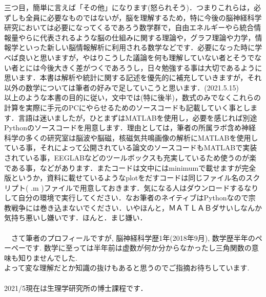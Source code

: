 \documentclass[11pt,a4paper,uplatex]{ujreport}
\begin{document}
三つ目，簡単に言えば「その他」になります(怒られそう)．つまりこれらは，必ずしも全員に必要なものではないが，脳を理解するため，特に今後の脳神経科学研究においては必要になってくるであろう数学群で，自由エネルギーやら統合情報量やらに代表されるような脳の仕組みに関する理論や，グラフ理論や力学，情報学といった新しい脳情報解析に利用される数学などです．必要になった時に学べば良いと思いますが，やはりこうした議論を何も理解していない者とそうでない者とには今後大きく差がつくであろうし，日々勉強する事は大切であるように思います．本書は解析や統計に関する記述を優先的に補充していきますが，それ以外の数学については筆者の好みで足していこうと思います．(2021.5.15)\\
  以上のような本書の目的に従い，文中では(特に後半)，数式のみでなくこれらの計算を実際に手元のPCにやらせるためのソースコードも記載していく事とします．言語は迷いましたが，ひとまずはMATLABを使用し，必要を感じれば別途Pythonのソースコードを用意します．理由としては，筆者の所属ラボ含め神経科学の多くの研究室は脳波や脳磁，核磁気共鳴画像の解析にMATLABを使用している事，それによって公開されている論文のソースコードもMATLABで実装されている事，EEGLABなどのツールボックスも充実しているため使うのが楽である事，などがあります．またコードは文中にはminimumで載せますが完全版というか，資料に載せているようなplotをだすコードは同じファイル名のスクリプト( .m )ファイルで用意しておきます．気になる人はダウンロードするなりして自分の環境で実行してください．なお筆者のネイティブはPythonなので宗教戦争には巻き込まないでください．いやほんと，ＭＡＴＬＡＢダサいしなんか気持ち悪いし嫌いです．ほんと．まじ嫌い．\\
\\

　さて筆者のプロフィールですが, 脳神経科学歴1年(2018年9月), 数学歴半年のペーペーです. 数学に至っては半年前は虚数が何か分からなかったし三角関数の意味も知りませんでした.\\
よって変な理解だとか知識の抜けもあると思うのでご指摘お待ちしています.\\
\\
2021/5現在は生理学研究所の博士課程です．
\\
\end{document}
